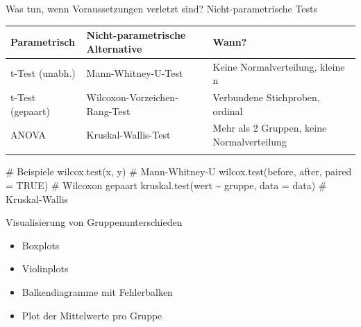 \documentclass[
  ignorenonframetext,
]{beamer}
\newenvironment{Shaded}{\begin{snugshade}}{\end{snugshade}}
\newcommand{\AttributeTok}[1]{\textcolor[rgb]{0.40,0.45,0.13}{#1}}
\newcommand{\CommentTok}[1]{\textcolor[rgb]{0.37,0.37,0.37}{#1}}
\newcommand{\ConstantTok}[1]{\textcolor[rgb]{0.56,0.35,0.01}{#1}}
\newcommand{\FunctionTok}[1]{\textcolor[rgb]{0.28,0.35,0.67}{#1}}
\newcommand{\NormalTok}[1]{\textcolor[rgb]{0.00,0.23,0.31}{#1}}
\newcommand{\SpecialCharTok}[1]{\textcolor[rgb]{0.37,0.37,0.37}{#1}}
\newcounter{none} %
\providecommand{\tightlist}{%
  \setlength{\itemsep}{0pt}\setlength{\parskip}{0pt}}
\begin{document}
\begin{frame}[fragile]{Was tun, wenn Voraussetzungen verletzt sind?
Nicht-parametrische Tests}
\protect{}\label{was-tun-wenn-voraussetzungen-verletzt-sind-nicht-parametrische-tests}
{\def\LTcaptype{none} %
\begin{longtable}[]{@{}
  >{\raggedright\arraybackslash}p{}
  >{\raggedright\arraybackslash}p{}
  >{\raggedright\arraybackslash}p{}@{}}
\toprule\noalign{}
\begin{minipage}[b]{\linewidth}\raggedright
Parametrisch
\end{minipage} & \begin{minipage}[b]{\linewidth}\raggedright
Nicht-parametrische Alternative
\end{minipage} & \begin{minipage}[b]{\linewidth}\raggedright
Wann?
\end{minipage} \\
\midrule\noalign{}
\endhead
t-Test (unabh.) & Mann-Whitney-U-Test & Keine Normalverteilung, kleine
n \\
t-Test (gepaart) & Wilcoxon-Vorzeichen-Rang-Test & Verbundene
Stichproben, ordinal \\
ANOVA & Kruskal-Wallis-Test & Mehr als 2 Gruppen, keine
Normalverteilung \\
\bottomrule\noalign{}
\end{longtable}
}

\begin{Shaded}
\begin{Highlighting}[]
\CommentTok{\# Beispiele}
\FunctionTok{wilcox.test}\NormalTok{(x, y)                          }\CommentTok{\# Mann{-}Whitney{-}U}
\FunctionTok{wilcox.test}\NormalTok{(before, after, }\AttributeTok{paired =} \ConstantTok{TRUE}\NormalTok{)  }\CommentTok{\# Wilcoxon gepaart}
\FunctionTok{kruskal.test}\NormalTok{(wert }\SpecialCharTok{\textasciitilde{}}\NormalTok{ gruppe, }\AttributeTok{data =}\NormalTok{ data)   }\CommentTok{\# Kruskal{-}Wallis}
\end{Highlighting}
\end{Shaded}
\end{frame}

\begin{frame}{Visualisierung von Gruppenunterschieden}
\protect{}\label{visualisierung-von-gruppenunterschieden}
\begin{itemize}
\tightlist
\item
  Boxplots
\item
  Violinplots
\item
  Balkendiagramme mit Fehlerbalken
\item
  Plot der Mittelwerte pro Gruppe
\end{itemize}
\end{frame}
\end{document}
